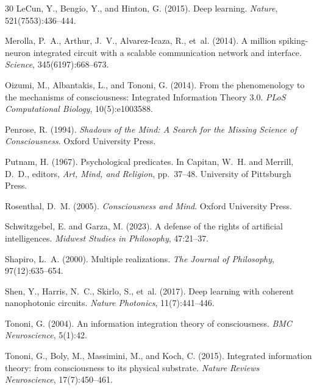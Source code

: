\documentclass[12pt,a4paper]{article}
\begin{document}
\begin{thebibliography}{30}
LeCun, Y., Bengio, Y., and Hinton, G. (2015).
\newblock Deep learning.
\newblock \emph{Nature}, 521(7553):436--444.

Merolla, P.~A., Arthur, J.~V., Alvarez-Icaza, R., et~al. (2014).
\newblock A million spiking-neuron integrated circuit with a scalable communication network and interface.
\newblock \emph{Science}, 345(6197):668--673.

Oizumi, M., Albantakis, L., and Tononi, G. (2014).
\newblock From the phenomenology to the mechanisms of consciousness: Integrated Information Theory 3.0.
\newblock \emph{PLoS Computational Biology}, 10(5):e1003588.

Penrose, R. (1994).
\newblock \emph{Shadows of the Mind: A Search for the Missing Science of Consciousness}.
\newblock Oxford University Press.

Putnam, H. (1967).
\newblock Psychological predicates.
\newblock In Capitan, W.~H. and Merrill, D.~D., editors, \emph{Art, Mind, and Religion}, pp.\ 37--48.
\newblock University of Pittsburgh Press.

Rosenthal, D.~M. (2005).
\newblock \emph{Consciousness and Mind}.
\newblock Oxford University Press.

Schwitzgebel, E. and Garza, M. (2023).
\newblock A defense of the rights of artificial intelligences.
\newblock \emph{Midwest Studies in Philosophy}, 47:21--37.

Shapiro, L.~A. (2000).
\newblock Multiple realizations.
\newblock \emph{The Journal of Philosophy}, 97(12):635--654.

Shen, Y., Harris, N.~C., Skirlo, S., et~al. (2017).
\newblock Deep learning with coherent nanophotonic circuits.
\newblock \emph{Nature Photonics}, 11(7):441--446.

Tononi, G. (2004).
\newblock An information integration theory of consciousness.
\newblock \emph{BMC Neuroscience}, 5(1):42.

Tononi, G., Boly, M., Massimini, M., and Koch, C. (2015).
\newblock Integrated information theory: from consciousness to its physical substrate.
\newblock \emph{Nature Reviews Neuroscience}, 17(7):450--461.

\end{thebibliography}
\end{document}
